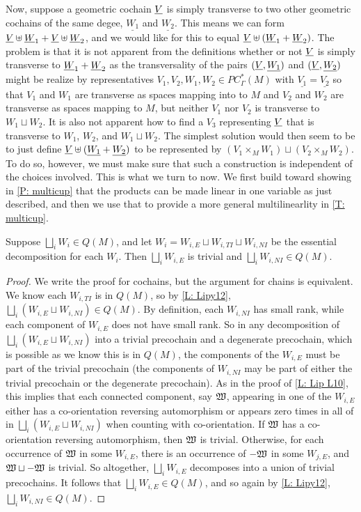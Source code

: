 Now, suppose a geometric cochain $\underline{V}$ is simply transverse to two other geometric cochains of the same degee, $\underline{W_1}$ and $\underline{W_2}$.
This means we can form $\underline{V}\uplus \underline{W}_1+\underline{V}\uplus \underline{W}_2$, and we would like for this to equal $\underline{V}\uplus (\underline{W}_1+\underline{W}_2)$.
The problem is that it is not apparent from the definitions whether or not $\underline{V}$ is simply transverse to $\underline{W}_1+\underline{W}_2$ as the transversality of the pairs $(\underline{V},\underline{W_1})$ and $(\underline{V},\underline{W_2})$ might be realize by representatives $V_1,V_2, W_1,W_2 \in PC^*_\Gamma(M)$ with $\underline{V_1} = \underline{V_2}$ so that $V_1$ and $W_1$ are transverse as spaces mapping into to $M$ and $V_2$ and $W_2$ are transverse as spaces mapping to $M$, but neither $V_1$ nor $V_2$ is transverse to $W_1 \sqcup W_2$.
It is also not apparent how to find a $V_3$ representing $\underline{V}$ that is transverse to $W_1$, $W_2$, and $W_1 \sqcup W_2$.
The simplest solution would then seem to be to just define
$\underline{V}\uplus (\underline{W_1}+\underline{W_2})$ to be represented by $(V_1 \times_M W_1) \sqcup (V_2 \times_M W_2)$.
To do so, however, we must make sure that such a construction is independent of the choices involved.
This is what we turn to now.
We first build toward showing in \cref{P: multicup} that the products can be made linear in one variable as just described, and then we use that to provide a more general multilinearlity in \cref{T: multicup}.

\begin{lemma}\label{L: Q essential}
	Suppose $\bigsqcup_i W_i \in Q(M)$, and let $W_i = W_{i,E} \sqcup W_{i,TI} \sqcup W_{i,NI}$ be the essential decomposition for each $W_i$.
	Then $\bigsqcup_i W_{i,E}$ is trivial and $\bigsqcup_i W_{i,NI} \in Q(M)$.
\end{lemma}

\begin{proof}
	We write the proof for cochains, but the argument for chains is equivalent.
	We know each $W_{i,TI}$ is in $Q(M)$, so by \cref{L: Lipy12}, $\bigsqcup_i (W_{i,E} \sqcup W_{i,NI}) \in Q(M)$.
	By definition, each $W_{i,NI}$ has small rank, while each component of $W_{i,E}$ does not have small rank.
	So in any decomposition of $\bigsqcup_i (W_{i,E} \sqcup W_{i,NI})$ into a trivial precochain and a degenerate precochain, which is possible as we know this is in $Q(M)$, the components of the $W_{i,E}$ must be part of the trivial precochain (the components of $W_{i, NI}$ may be part of either the trivial precochain or the degenerate precochain).
	As in the proof of \cref{L: Lip L10}, this implies that each connected component, say $\mathfrak W$, appearing in one of the $W_{i,E}$ either has a co-orientation reversing automorphism or appears zero times in all of in $\bigsqcup_i (W_{i,E} \sqcup W_{i,NI})$ when counting with co-orientation.
	If $\mathfrak W$ has a co-orientation reversing automorphism, then $\mathfrak W$ is trivial.
	Otherwise, for each occurrence of $\mathfrak W$ in some $W_{i,E}$, there is an occurrence of $-\mathfrak W$ in some $W_{j,E}$, and $\mathfrak W \sqcup -\mathfrak W$ is trivial.
	So altogether, $\bigsqcup_i W_{i,E}$ decomposes into a union of trivial precochains.
	It follows that $\bigsqcup_i W_{i,E} \in Q(M)$, and so again by \cref{L: Lipy12}, $\bigsqcup_i W_{i,NI} \in Q(M)$.
\end{proof}

